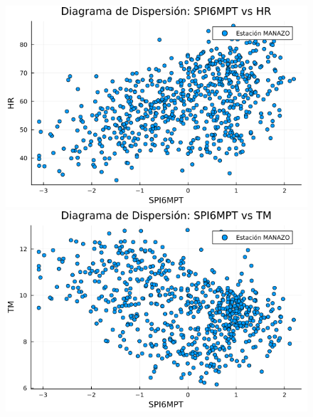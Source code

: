 \begin{figure}[htbp]
\begin{minipage}{0.32\textwidth}
\end{minipage}

\vspace{0.5cm}  %

\begin{minipage}{0.32\textwidth}
    \centering
    \includegraphics[width=\linewidth]{Capitulos/Scaterplot/MANAZO_SPI6MPT_vs_HR.png}
\end{minipage}\hfill
\begin{minipage}{0.32\textwidth}
    \centering
    \includegraphics[width=\linewidth]{Capitulos/Scaterplot/MANAZO_SPI6MPT_vs_TM.png}
\end{minipage}\hfill
\begin{minipage}{0.32\textwidth}
    \centering

\end{minipage}
\end{figure}
